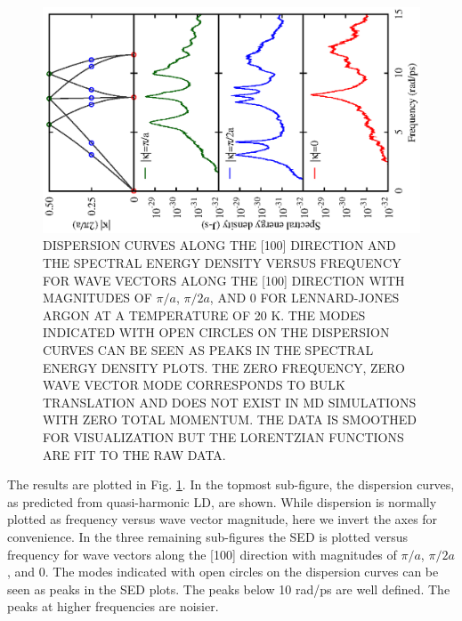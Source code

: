 \documentclass[twocolumn,10pt]{asme2e}
\begin{document}
\begin{figure}[tb]
\includegraphics[angle=-90]{Ar_20K_4x4x4UC-SED}
\caption{\label{F:SED}DISPERSION CURVES ALONG THE [100] DIRECTION AND THE SPECTRAL
ENERGY DENSITY VERSUS FREQUENCY FOR WAVE VECTORS ALONG THE [100] DIRECTION
WITH MAGNITUDES OF $\pi/a$, $\pi/2a$, AND 0 FOR LENNARD-JONES ARGON AT A TEMPERATURE OF 20 K. THE MODES INDICATED WITH OPEN CIRCLES ON THE
DISPERSION CURVES CAN BE SEEN AS PEAKS IN THE SPECTRAL ENERGY DENSITY PLOTS.
THE ZERO FREQUENCY, ZERO WAVE VECTOR MODE CORRESPONDS TO BULK TRANSLATION AND DOES NOT EXIST IN MD SIMULATIONS WITH ZERO TOTAL MOMENTUM.
THE DATA IS SMOOTHED FOR VISUALIZATION BUT THE LORENTZIAN FUNCTIONS ARE FIT TO THE RAW DATA.}
\vspace*{-5mm}
\end{figure}

The results are plotted in Fig$.$ \ref{F:SED}. In the topmost sub-figure, the
dispersion curves, as predicted from quasi-harmonic LD, are shown. While
dispersion is normally plotted as frequency versus wave vector magnitude,
here we invert the axes for convenience. In the three remaining sub-figures
the SED is plotted versus frequency for wave vectors along the [100]
direction with magnitudes of $\pi/a$, $\pi/2a$, and 0.  The modes indicated
with open circles on the dispersion curves can be seen as peaks in the SED
plots.  The peaks below 10 rad/ps are well defined. The peaks at higher
frequencies are noisier.
\end{document}
